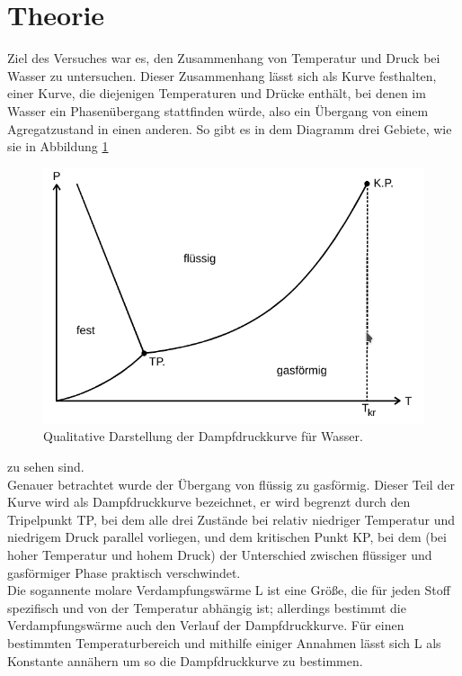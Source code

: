 \section{Theorie}
\label{sec:Theorie}
Ziel des Versuches war es, den Zusammenhang von Temperatur und Druck bei Wasser 
zu untersuchen. Dieser Zusammenhang lässt sich als Kurve festhalten,
einer Kurve, die diejenigen Temperaturen und Drücke enthält, bei denen im Wasser
ein Phasenübergang stattfinden würde, also ein Übergang von einem Agregatzustand
in einen anderen. So gibt es in dem Diagramm drei Gebiete, wie sie in Abbildung \ref{fig:kurve}
\begin{figure}
    \centering
    \includegraphics[width=\textwidth]{dampfdruckkurve.png}
    \caption{Qualitative Darstellung der Dampfdruckkurve für Wasser.}
    \label{fig:kurve}
\end{figure}
zu sehen sind. \\
Genauer betrachtet wurde der Übergang von flüssig zu gasförmig. Dieser Teil der Kurve wird als
Dampfdruckkurve bezeichnet, er wird begrenzt durch den Tripelpunkt TP, bei dem alle drei Zustände
bei relativ niedriger Temperatur und niedrigem Druck parallel vorliegen, und dem kritischen
Punkt KP, bei dem (bei hoher Temperatur und hohem Druck) der Unterschied zwischen flüssiger und
gasförmiger Phase praktisch verschwindet.\\
Die sogannente molare Verdampfungswärme L ist eine Größe, die für jeden Stoff spezifisch und von der 
Temperatur abhängig ist; allerdings bestimmt die Verdampfungswärme auch den Verlauf der 
Dampfdruckkurve. Für einen bestimmten Temperaturbereich und mithilfe einiger Annahmen lässt sich
L als Konstante annähern um so die Dampfdruckkurve zu bestimmen. \\

